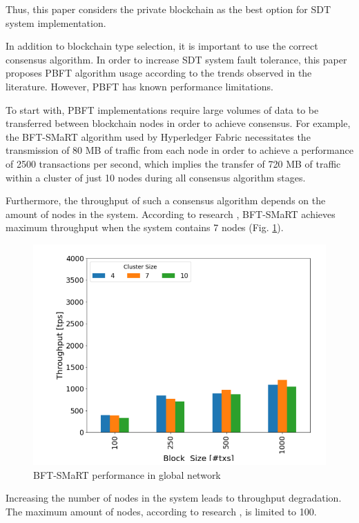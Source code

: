 \documentclass[10pt]{llncs}
\begin{document}
Thus, this paper considers the private blockchain as the best option for SDT system implementation.

In addition to blockchain type selection, it is important to use the correct consensus algorithm.
In order to increase SDT system fault tolerance, this paper proposes PBFT algorithm usage according to the trends observed in the literature.
However, PBFT has known performance limitations.

To start with, PBFT implementations require large volumes of data to be transferred between blockchain nodes in order to achieve consensus.
For example, the BFT-SMaRT algorithm used by Hyperledger Fabric \cite{barger2021byzantine} necessitates the transmission of 80 MB of traffic from each node 
in order to achieve a performance of 2500 transactions per second, which implies the transfer of 720 MB of traffic within a cluster of just 10 nodes during all consensus algorithm stages.

Furthermore, the throughput of such a consensus algorithm depends on the amount of nodes in the system.
According to research \cite{barger2021byzantine}, BFT-SMaRT achieves maximum throughput when the system contains 7 nodes (Fig. \ref{fig:smartbft-global}).

\begin{figure}[ht!]
    \centering\includegraphics[width=\textwidth]{smartbft-global.png}
    \caption{BFT-SMaRT performance in global network}
    \label{fig:smartbft-global}
\end{figure}

Increasing the number of nodes in the system leads to throughput degradation.
The maximum amount of nodes, according to research \cite{Ke2023}, is limited to 100.
\end{document}
